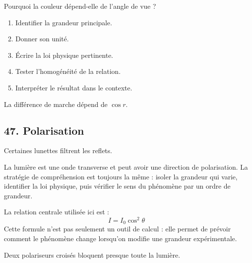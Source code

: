 \documentclass[11pt,a4paper]{article}
\begin{document}
\begin{exercicebox}
Pourquoi la couleur dépend-elle de l'angle de vue ?
\begin{enumerate}
  \item Identifier la grandeur principale.
  \item Donner son unité.
  \item Écrire la loi physique pertinente.
  \item Tester l'homogénéité de la relation.
  \item Interpréter le résultat dans le contexte.
\end{enumerate}
\end{exercicebox}

\begin{corrigebox}[Indication]
La différence de marche dépend de $\cos r$.
\end{corrigebox}


\subsection{47. Polarisation}

\begin{exemplebox}
Certaines lunettes filtrent les reflets.
\end{exemplebox}

\begin{methodebox}
La lumière est une onde transverse et peut avoir une direction de polarisation.
La stratégie de compréhension est toujours la même : isoler la grandeur qui varie, identifier la loi physique, puis vérifier le sens du phénomène par un ordre de grandeur.
\end{methodebox}

\begin{theorembox}
La relation centrale utilisée ici est :
\[
I=I_0\cos^2\theta
\]
Cette formule n'est pas seulement un outil de calcul : elle permet de prévoir comment le phénomène change lorsqu'on modifie une grandeur expérimentale.
\end{theorembox}

\begin{odgbox}
Deux polariseurs croisés bloquent presque toute la lumière.
\end{odgbox}
\end{document}
